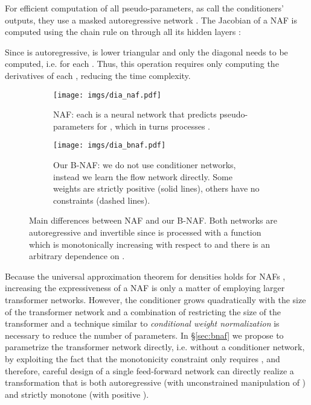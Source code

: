 \documentclass[letterpaper]{article}
\begin{document}
For efficient computation of all pseudo-parameters, as \citet{huang2018neural} call the conditioners' outputs, they use a masked autoregressive network \citep{germain2015made}. The Jacobian of a NAF is computed using the chain rule on  through all its hidden layers :

Since  is autoregressive,  is lower triangular and only the diagonal needs to be computed, i.e.  for each . Thus, this operation requires only computing the derivatives of each , reducing the time complexity.

\begin{figure}[t]
 \centering
 \begin{subfigure}[b]{0.95\linewidth}
 \centering
 \texttt{[image: imgs/dia\_naf.pdf]}
 \caption{NAF: each  is a neural network that predicts pseudo-parameters for , which in turns processes .}
 \label{fig:architectures_naf}
 \end{subfigure}\vspace{1em}
 \begin{subfigure}[b]{\linewidth}
 \centering
 \texttt{[image: imgs/dia\_bnaf.pdf]}
 \caption{Our B-NAF: we do not use conditioner networks, instead we learn the flow network directly. Some weights are strictly positive (solid lines), others have no constraints (dashed lines).}
 \label{fig:architectures_bnaf}
 \end{subfigure}\caption{Main differences between NAF \citep{huang2018neural} and our B-NAF. Both networks are autoregressive and invertible since  is processed with a function  which is monotonically increasing with respect to  and there is an arbitrary dependence on .}
 \label{fig:architectures}
\end{figure}

Because the universal approximation theorem for densities holds for NAFs \citep{huang2018neural}, increasing the expressiveness of a NAF is only a matter of employing larger transformer networks. However, the conditioner grows quadratically with the size of the transformer network and a combination of restricting the size of the transformer and a technique similar to \emph{conditional weight normalization} \citep{krueger2017bayesian} is necessary to reduce the number of parameters. In \S\ref{sec:bnaf} we propose to parametrize the transformer network directly, i.e. without a conditioner network, by exploiting the fact that the monotonicity constraint only requires , and therefore, careful design of a single feed-forward network can directly realize a transformation that is both autoregressive (with unconstrained manipulation of ) and strictly monotone (with positive ). 
\end{document}
